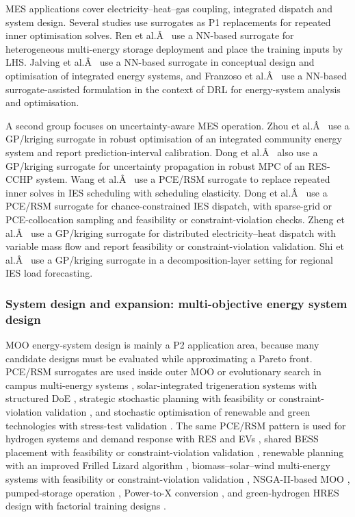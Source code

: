 MES applications cover electricity--heat--gas coupling, integrated
dispatch and system design. Several studies use surrogates as P1
replacements for repeated inner optimisation solves. Ren et
al.Â~\cite{Ren2024} use a NN-based surrogate for heterogeneous multi-energy
storage deployment and place the training inputs by LHS. Jalving et
al.Â~\cite{Jalving2023} use a NN-based surrogate in conceptual design and
optimisation of integrated energy systems, and Franzoso et
al.Â~\cite{Franzoso2025} use a NN-based surrogate-assisted formulation in the
context of DRL for energy-system analysis and optimisation.

A second group focuses on uncertainty-aware MES operation. Zhou et
al.Â~\cite{Zhou20181} use a GP/kriging surrogate in robust optimisation of an
integrated community energy system and report prediction-interval
calibration. Dong et al.Â~\cite{Dong2022} also use a GP/kriging surrogate for
uncertainty propagation in robust MPC of an RES-CCHP system. Wang et
al.Â~\cite{Wang2020202933} use a PCE/RSM surrogate to replace repeated inner
solves in IES scheduling with scheduling elasticity. Dong et
al.Â~\cite{Dong2023} use a PCE/RSM surrogate for chance-constrained IES
dispatch, with sparse-grid or PCE-collocation sampling and feasibility
or constraint-violation checks. Zheng et al.Â~\cite{Zheng20231907} use a
GP/kriging surrogate for distributed electricity--heat dispatch with
variable mass flow and report feasibility or constraint-violation
validation. Shi et al.Â~\cite{Shi2024__2} use a GP/kriging surrogate in a
decomposition-layer setting for regional IES load forecasting.

\subsubsection{System design and expansion: multi-objective energy system design}
\label{sec:apps:moo}

MOO energy-system design is mainly a P2 application area, because many
candidate designs must be evaluated while approximating a Pareto front.
PCE/RSM surrogates are used inside outer MOO or evolutionary search in
campus multi-energy systems \cite{Dong2024}, solar-integrated trigeneration
systems with structured DoE \cite{Salahinezhad2025}, strategic stochastic
planning with feasibility or constraint-violation validation
\cite{alahmad_enhancing_2025}, and stochastic optimisation of renewable and
green technologies with stress-test validation
\cite{alahmad_optimizing_2025}. The same PCE/RSM pattern is used for
hydrogen systems and demand response with RES and EVs
\cite{ali_optimizing_2025}, shared BESS placement with feasibility or
constraint-violation validation \cite{an_multi-objective_2025}, renewable
planning with an improved Frilled Lizard algorithm
\cite{bendriss_novel_2025}, biomass--solar--wind multi-energy systems with
feasibility or constraint-violation validation
\cite{chen_multi-objective_2025-1}, NSGA-II-based MOO
\cite{cortes-caicedo_multi-objective_2025}, pumped-storage operation
\cite{liang_high_2024}, Power-to-X conversion \cite{malla_sg_optimization_2024},
and green-hydrogen HRES design with factorial training designs
\cite{tezer_multi-objective_2025}.

